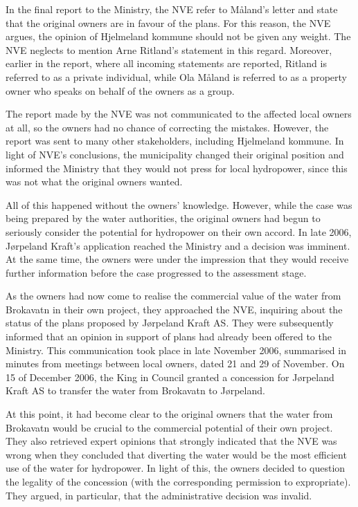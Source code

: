 In the final report to the Ministry, the NVE refer to Måland's letter and state that the original owners are in favour of the plans. For this reason, the NVE argues, the opinion of Hjelmeland kommune should not be given any weight. The NVE neglects to mention Arne Ritland's statement in this regard. Moreover, earlier in the report, where all incoming statements are reported, Ritland is referred to as a private individual, while Ola Måland is referred to as a property owner who speaks on behalf of the owners as a group.

The report made by the NVE was not communicated to the affected local owners at all, so the owners had no chance of correcting the mistakes. However, the report was sent to many other stakeholders, including Hjelmeland kommune. In light of NVE's conclusions, the municipality changed their original position and informed the Ministry that they would not press for local hydropower, since this was not what the original owners wanted.

All of this happened without the owners' knowledge. However, while the case was being prepared by the water authorities, the original owners had begun to seriously consider the potential for hydropower on their own accord. In late 2006, Jørpeland Kraft's application reached the Ministry and a decision was imminent. At the same time, the owners were under the impression that they would receive further information before the case progressed to the assessment stage. 

As the owners had now come to realise the commercial value of the water from Brokavatn in their own project, they approached the NVE, inquiring about the status of the plans proposed by Jørpeland Kraft AS. They were subsequently informed that an opinion in support of plans had already been offered to the Ministry. This communication took place in late November 2006, summarised in minutes from meetings between local owners, dated 21 and 29 of November. On 15 of December 2006, the King in Council granted a concession for Jørpeland Kraft AS to transfer the water from Brokavatn to Jørpeland.

At this point, it had become clear to the original owners that the water from Brokavatn would be crucial to the commercial potential of their own project. They also retrieved expert opinions that strongly indicated that the NVE was wrong when they concluded that diverting the water would be the most efficient use of the water for hydropower. In light of this, the owners decided to question the legality of the concession (with the corresponding permission to expropriate). They argued, in particular, that the administrative decision was invalid.

